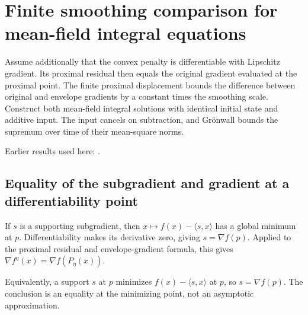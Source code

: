 \documentclass[11pt,a4paper]{report}
\begin{document}
\section{\texorpdfstring{Finite smoothing comparison for mean-field integral equations}{Finite smoothing comparison for mean-field integral equations}}
\label{proof-module-ProximalLangevin-MeanFieldSmoothing-lean}


Assume additionally that the convex penalty is differentiable with Lipschitz gradient. Its proximal residual then equals the original gradient evaluated at the proximal point. The finite proximal displacement bounds the difference between original and envelope gradients by a constant times the smoothing scale. Construct both mean-field integral solutions with identical initial state and additive input. The input cancels on subtraction, and Grönwall bounds the supremum over time of their mean-square norms.




Earlier results used here: \cite[Section~3.43]{LangevinLean2026ULASC}.
\subsection{\texorpdfstring{Equality of the subgradient and gradient at a differentiability point}{Equality of the subgradient and gradient at a differentiability point}}
\label{report-step-ProximalLangevin-MeanFieldSmoothing-lean-1}


If \(s\) is a supporting subgradient, then \(x\mapsto f(x)-\langle s,x\rangle\) has a global minimum at \(p\). Differentiability makes its derivative zero, giving \(s=\nabla f(p)\). Applied to the proximal residual and envelope-gradient formula, this gives \(\nabla f^\eta(x)=\nabla f(P_\eta(x))\).



Equivalently, a support \(s\) at \(p\) minimizes \(f(x)-\langle s,x\rangle\) at \(p\), so \(s=\nabla f(p)\). The conclusion is an equality at the minimizing point, not an asymptotic approximation.
\end{document}
